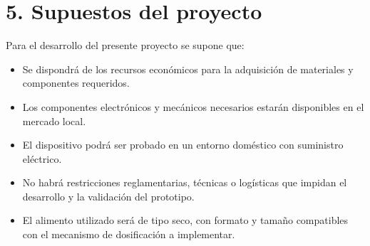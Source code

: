 \documentclass[
11pt, %
]{charter}
\begin{document}
\section{5. Supuestos del proyecto}
\label{sec:supuestos}

Para el desarrollo del presente proyecto se supone que:

\begin{itemize}
	\item Se dispondrá de los recursos económicos para la adquisición de materiales y componentes requeridos.
	\item Los componentes electrónicos y mecánicos necesarios estarán disponibles en el mercado local.
	\item El dispositivo podrá ser probado en un entorno doméstico con suministro eléctrico.
	\item No habrá restricciones reglamentarias, técnicas o logísticas que impidan el desarrollo y la validación del prototipo.
	\item El alimento utilizado será de tipo seco, con formato y tamaño compatibles con el mecanismo de dosificación a implementar.
	
\end{itemize}
\end{document}
